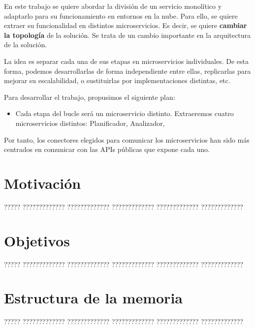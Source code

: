 En este trabajo se quiere abordar la división de un servicio monolítico y adaptarlo para su funcionamiento en entornos en la nube. Para ello, se quiere extraer su funcionalidad en distintos microservicios. Es decir, se quiere \textbf{cambiar la topología} de la solución. Se trata de un cambio importante en la arquitectura de la solución.


La idea es separar cada una de sus etapas en microservicios individuales. De esta forma, podemos desarrollarlas de forma independiente entre ellas, replicarlas para mejorar su escalabilidad, o sustituirlas por implementaciones distintas, etc.

Para desarrollar el trabajo, propusimos el siguiente plan:
\begin{itemize}
  \item Cada etapa del bucle será un microservicio distinto. Extraeremos cuatro microservicios distintos: Planificador, Analizador,
\end{itemize}

Por tanto, los conectores elegidos para comunicar los microservicios han sido más centrados en comunicar con las APIs públicas que expone cada uno.

\section{Motivación}

????? ????????????? ????????????? ????????????? ????????????? ?????????????

\section{Objetivos}

????? ????????????? ????????????? ????????????? ????????????? ?????????????

\section{Estructura de la memoria}

????? ????????????? ????????????? ????????????? ????????????? ?????????????


